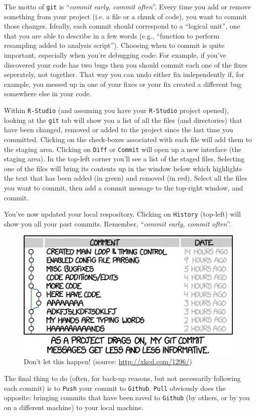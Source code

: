 \documentclass[12pt,letterpaper]{article}
\begin{document}
The motto of \texttt{git} is ``\emph{commit early, commit often}''.  Every time you add or remove something from your project (i.e. a file or a chunk of code), you want to commit those changes.   Ideally, each commit should correspond to a ``logical unit'', one that you are able to describe in a few words (e.g., ``function to perform resampling added to analysis script''). Choosing when to commit is quite important, especially when you're debugging code:  For example, if you've discovered your code has two bugs then you should commit each one of the fixes seperately, not together.  That way you can undo either fix independently if, for example, you messed up in one of your fixes or your fix created a different bug somewhere else in your code.

Within \texttt{R-Studio} (and assuming you have your \texttt{R-Studio} project opened), looking at the \texttt{git} tab will show you a list of all the files (and directories) that have been changed, removed or added to the project since the last time you committed.  Clicking on the check-boxes associated with each file will add them to the staging area.  Clicking on \texttt{Diff} or \texttt{Commit} will open up a new interface (the staging area).  In the top-left corner you'll see a list of the staged files.  Selecting one of the files will bring its contents up in the window below which highlights the text that has been added (in green) and removed (in red).  Select all the files you want to commit, then add a commit message to the top-right window, and commit.  

You've now updated your local respository.  Clicking on \texttt{History} (top-left) will show you all your past commits.  Remember, ``\emph{commit early, commit often}''.


\begin{figure}
	\centering
	\includegraphics[width=0.5\linewidth]{figs/xkcd_git_commit.png}
	\caption{Don't let this happen!  (source: \url{http://xkcd.com/1296/})}
	\label{fig:commit_messages}
\end{figure}

The final thing to do (often, for back-up reasons, but not necessarily following each commit) is to \texttt{Push} your commit to \texttt{Github}.  \texttt{Pull} obviously does the opposite: bringing commits that have been saved to \texttt{Github} (by others, or by you on a different machine) to your local machine.
\end{document}
